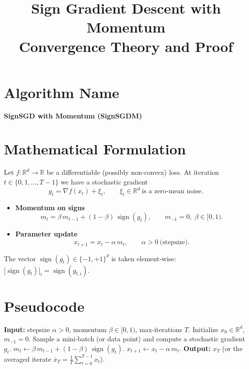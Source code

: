 \documentclass[11pt]{article}
\newcommand{\RR}{\mathbb{R}}
\newcommand{\sign}{\operatorname{sign}}
\begin{document}
\title{Sign Gradient Descent with Momentum \\ Convergence Theory and Proof}
\author{ }
\date{ }
\maketitle

\section*{Algorithm Name}
\textbf{SignSGD with Momentum (SignSGDM)}  

\section*{Mathematical Formulation}
Let $f:\RR^{d}\rightarrow\RR$ be a differentiable (possibly non‑convex) loss.  
At iteration $t\in\{0,1,\dots,T-1\}$ we have a stochastic gradient
\[
g_{t}= \nabla f(x_{t})+\xi_{t},
\qquad \xi_{t}\in\RR^{d}\ \text{is a zero‑mean noise.}
\]

\begin{itemize}
\item \textbf{Momentum on signs}
\[
m_{t}= \beta\, m_{t-1} + (1-\beta)\,\sign(g_{t}),\qquad 
m_{-1}=0,\; \beta\in[0,1).
\tag{1}
\]
\item \textbf{Parameter update}
\[
x_{t+1}= x_{t}-\alpha\, m_{t},\qquad \alpha>0\ \text{(stepsize).}
\tag{2}
\]
\end{itemize}
The vector $\sign(g_{t})\in\{-1,+1\}^{d}$ is taken element‑wise:
$\big[\sign(g_{t})\big]_{i}= \sign(g_{t,i})$.

\section*{Pseudocode}
\begin{algorithm}[H]
\caption{SignSGD with Momentum}
\begin{algorithmic}[1]
\STATE \textbf{Input:} stepsize $\alpha>0$, momentum $\beta\in[0,1)$,
        max‑iterations $T$.
\STATE Initialize $x_{0}\in\RR^{d}$, $m_{-1}=0$.
    \STATE Sample a mini‑batch (or data point) and compute a stochastic gradient $g_{t}$.
    \STATE $m_{t}\gets \beta\,m_{t-1}+(1-\beta)\,\sign(g_{t})$.
    \STATE $x_{t+1}\gets x_{t}-\alpha\, m_{t}$.
\ENDFOR
\STATE \textbf{Output:} $x_{T}$ (or the averaged iterate $\bar x_T=\frac1T\sum_{t=0}^{T-1}x_{t}$).
\end{algorithmic}
\end{algorithm}
\end{document}
